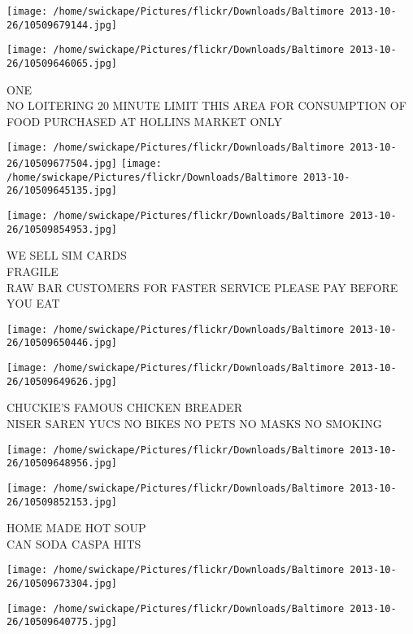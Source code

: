 \documentclass[10pt,letterpaper]{article}
\begin{document}
\texttt{[image: /home/swickape/Pictures/flickr/Downloads/Baltimore 2013-10-26/10509679144.jpg]}

\vspace{0.25in}
\texttt{[image: /home/swickape/Pictures/flickr/Downloads/Baltimore 2013-10-26/10509646065.jpg]}

ONE\\
NO LOITERING 20 MINUTE LIMIT THIS AREA FOR CONSUMPTION OF FOOD PURCHASED AT HOLLINS MARKET ONLY
\pagebreak

\texttt{[image: /home/swickape/Pictures/flickr/Downloads/Baltimore 2013-10-26/10509677504.jpg]}
\texttt{[image: /home/swickape/Pictures/flickr/Downloads/Baltimore 2013-10-26/10509645135.jpg]}

\vspace{0.25in}
\texttt{[image: /home/swickape/Pictures/flickr/Downloads/Baltimore 2013-10-26/10509854953.jpg]}

WE SELL SIM CARDS\\
FRAGILE\\
RAW BAR CUSTOMERS FOR FASTER SERVICE PLEASE PAY BEFORE YOU EAT
\pagebreak

\texttt{[image: /home/swickape/Pictures/flickr/Downloads/Baltimore 2013-10-26/10509650446.jpg]}

\vspace{0.25in}
\texttt{[image: /home/swickape/Pictures/flickr/Downloads/Baltimore 2013-10-26/10509649626.jpg]}

CHUCKIE'S FAMOUS CHICKEN BREADER\\
NISER SAREN YUCS NO BIKES NO PETS NO MASKS NO SMOKING
\pagebreak

\texttt{[image: /home/swickape/Pictures/flickr/Downloads/Baltimore 2013-10-26/10509648956.jpg]}

\vspace{0.25in}
\texttt{[image: /home/swickape/Pictures/flickr/Downloads/Baltimore 2013-10-26/10509852153.jpg]}

HOME MADE HOT SOUP\\
CAN SODA CASPA HITS
\pagebreak

\texttt{[image: /home/swickape/Pictures/flickr/Downloads/Baltimore 2013-10-26/10509673304.jpg]}

\vspace{0.25in}
\texttt{[image: /home/swickape/Pictures/flickr/Downloads/Baltimore 2013-10-26/10509640775.jpg]}
\end{document}
